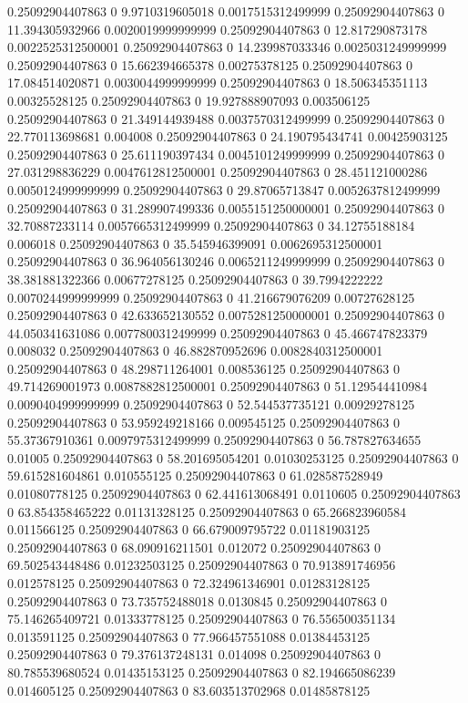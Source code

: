 0.25092904407863 0 9.9710319605018 0.0017515312499999
0.25092904407863 0 11.394305932966 0.0020019999999999
0.25092904407863 0 12.817290873178 0.0022525312500001
0.25092904407863 0 14.239987033346 0.0025031249999999
0.25092904407863 0 15.662394665378 0.00275378125
0.25092904407863 0 17.084514020871 0.0030044999999999
0.25092904407863 0 18.506345351113 0.00325528125
0.25092904407863 0 19.927888907093 0.003506125
0.25092904407863 0 21.349144939488 0.0037570312499999
0.25092904407863 0 22.770113698681 0.004008
0.25092904407863 0 24.190795434741 0.00425903125
0.25092904407863 0 25.611190397434 0.0045101249999999
0.25092904407863 0 27.031298836229 0.0047612812500001
0.25092904407863 0 28.451121000286 0.0050124999999999
0.25092904407863 0 29.87065713847 0.0052637812499999
0.25092904407863 0 31.289907499336 0.0055151250000001
0.25092904407863 0 32.70887233114 0.0057665312499999
0.25092904407863 0 34.12755188184 0.006018
0.25092904407863 0 35.545946399091 0.0062695312500001
0.25092904407863 0 36.964056130246 0.0065211249999999
0.25092904407863 0 38.381881322366 0.00677278125
0.25092904407863 0 39.7994222222 0.0070244999999999
0.25092904407863 0 41.216679076209 0.00727628125
0.25092904407863 0 42.633652130552 0.0075281250000001
0.25092904407863 0 44.050341631086 0.0077800312499999
0.25092904407863 0 45.466747823379 0.008032
0.25092904407863 0 46.882870952696 0.0082840312500001
0.25092904407863 0 48.298711264001 0.008536125
0.25092904407863 0 49.714269001973 0.0087882812500001
0.25092904407863 0 51.129544410984 0.0090404999999999
0.25092904407863 0 52.544537735121 0.00929278125
0.25092904407863 0 53.959249218166 0.009545125
0.25092904407863 0 55.37367910361 0.0097975312499999
0.25092904407863 0 56.787827634655 0.01005
0.25092904407863 0 58.201695054201 0.01030253125
0.25092904407863 0 59.615281604861 0.010555125
0.25092904407863 0 61.028587528949 0.01080778125
0.25092904407863 0 62.441613068491 0.0110605
0.25092904407863 0 63.854358465222 0.01131328125
0.25092904407863 0 65.266823960584 0.011566125
0.25092904407863 0 66.679009795722 0.01181903125
0.25092904407863 0 68.090916211501 0.012072
0.25092904407863 0 69.502543448486 0.01232503125
0.25092904407863 0 70.913891746956 0.012578125
0.25092904407863 0 72.324961346901 0.01283128125
0.25092904407863 0 73.735752488018 0.0130845
0.25092904407863 0 75.146265409721 0.01333778125
0.25092904407863 0 76.556500351134 0.013591125
0.25092904407863 0 77.966457551088 0.01384453125
0.25092904407863 0 79.376137248131 0.014098
0.25092904407863 0 80.785539680524 0.01435153125
0.25092904407863 0 82.194665086239 0.014605125
0.25092904407863 0 83.603513702968 0.01485878125
